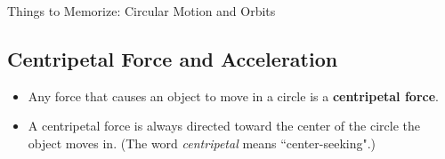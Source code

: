 \documentclass[letterpaper, 12pt]{article}
\begin{document}
	


\begin{center}Things to Memorize: Circular Motion and Orbits
\end{center}

\subsection*{Centripetal Force and Acceleration}
	\begin{itemize}
		\item Any force that causes an object to move in a circle is a \textbf{centripetal force}. 
		\item A centripetal force is always directed toward the center of the circle the object moves in. (The word \textit{centripetal} means ``center-seeking".)
	\end{itemize}
\end{document}
